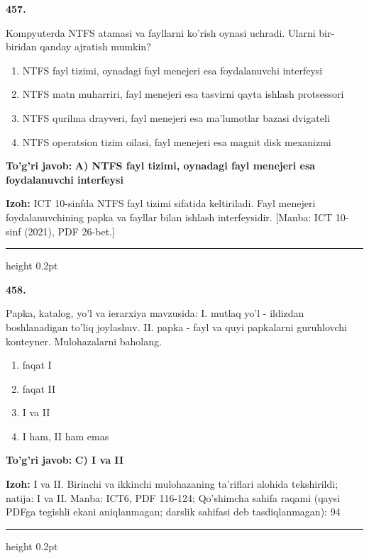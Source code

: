 \documentclass[10pt,a4paper]{article}
\begin{document}
{\bfseries\sffamily\color{ink} 457.}
\par
Kompyuterda NTFS atamasi va fayllarni ko'rish oynasi uchradi. Ularni bir-biridan qanday ajratish mumkin?
\begin{enumerate}[label=\Alph*),leftmargin=9mm]
\item NTFS fayl tizimi, oynadagi fayl menejeri esa foydalanuvchi interfeysi
\item NTFS matn muharriri, fayl menejeri esa tasvirni qayta ishlash protsessori
\item NTFS qurilma drayveri, fayl menejeri esa ma'lumotlar bazasi dvigateli
\item NTFS operatsion tizim oilasi, fayl menejeri esa magnit disk mexanizmi
\end{enumerate}
\begin{tcolorbox}[enhanced,breakable,colback=teal!4,colframe=teal!60!black,boxrule=0.45pt,arc=1.2mm,left=2.7mm,right=2.7mm,top=1.8mm,bottom=1.8mm,before skip=2mm,after skip=2mm]
{\bfseries\sffamily\color{teal}To'g'ri javob:} \textbf{A) NTFS fayl tizimi, oynadagi fayl menejeri esa foydalanuvchi interfeysi}
\par\smallskip
{\bfseries Izoh:} ICT 10-sinfda NTFS fayl tizimi sifatida keltiriladi. Fayl menejeri foydalanuvchining papka va fayllar bilan ishlash interfeysidir. [Manba: ICT 10-sinf (2021), PDF 26-bet.]
\end{tcolorbox}
\vspace{2mm}\hrule height 0.2pt\vspace{3mm}

{\bfseries\sffamily\color{ink} 458.}
\par
Papka, katalog, yo'l va ierarxiya mavzusida: I. mutlaq yo'l - ildizdan boshlanadigan to'liq joylashuv. II. papka - fayl va quyi papkalarni guruhlovchi konteyner. Mulohazalarni baholang.
\begin{enumerate}[label=\Alph*),leftmargin=9mm]
\item faqat I
\item faqat II
\item I va II
\item I ham, II ham emas
\end{enumerate}
\begin{tcolorbox}[enhanced,breakable,colback=teal!4,colframe=teal!60!black,boxrule=0.45pt,arc=1.2mm,left=2.7mm,right=2.7mm,top=1.8mm,bottom=1.8mm,before skip=2mm,after skip=2mm]
{\bfseries\sffamily\color{teal}To'g'ri javob:} \textbf{C) I va II}
\par\smallskip
{\bfseries Izoh:} I va II. Birinchi va ikkinchi mulohazaning ta'riflari alohida tekshirildi; natija: I va II. Manba: ICT6, PDF 116-124; Qo'shimcha sahifa raqami (qaysi PDFga tegishli ekani aniqlanmagan; darslik sahifasi deb tasdiqlanmagan): 94
\end{tcolorbox}
\vspace{2mm}\hrule height 0.2pt\vspace{3mm}
\end{document}

